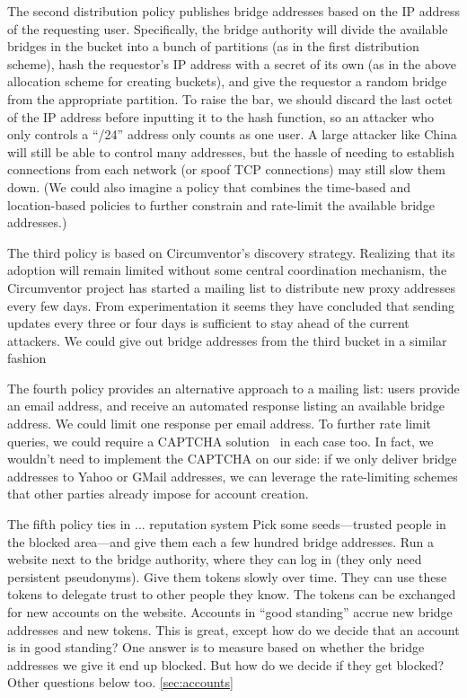 \documentclass{llncs}
\begin{document}
The second distribution policy publishes bridge addresses based on the IP
address of the requesting user. Specifically, the bridge authority will
divide the available bridges in the bucket into a bunch of partitions
(as in the first distribution scheme), hash the requestor's IP address
with a secret of its own (as in the above allocation scheme for creating
buckets), and give the requestor a random bridge from the appropriate
partition. To raise the bar, we should discard the last octet of the
IP address before inputting it to the hash function, so an attacker
who only controls a ``/24'' address only counts as one user. A large
attacker like China will still be able to control many addresses, but
the hassle of needing to establish connections from each network (or
spoof TCP connections) may still slow them down. (We could also imagine
a policy that combines the time-based and location-based policies to
further constrain and rate-limit the available bridge addresses.)

The third policy is based on Circumventor's discovery strategy. Realizing
that its adoption will remain limited without some central coordination
mechanism, the Circumventor project has started a mailing list to
distribute new proxy addresses every few days. From experimentation it
seems they have concluded that sending updates every three or four days
is sufficient to stay ahead of the current attackers. We could give out
bridge addresses from the third bucket in a similar fashion

The fourth policy provides an alternative approach to a mailing list:
users provide an email address, and receive an automated response
listing an available bridge address. We could limit one response per
email address. To further rate limit queries, we could require a CAPTCHA
solution~\cite{captcha} in each case too. In fact, we wouldn't need to
implement the CAPTCHA on our side: if we only deliver bridge addresses
to Yahoo or GMail addresses, we can leverage the rate-limiting schemes
that other parties already impose for account creation.

The fifth policy ties in
...
reputation system
Pick some seeds---trusted people in the blocked area---and give
them each a few hundred bridge addresses. Run a website next to the
bridge authority, where they can log in (they only need persistent
pseudonyms). Give them tokens slowly over time. They can use these
tokens to delegate trust to other people they know. The tokens can
be exchanged for new accounts on the website.
Accounts in ``good standing'' accrue new bridge addresses and new
tokens.
This is great, except how do we decide that an account is in good
standing? One answer is to measure based on whether the bridge addresses
we give it end up blocked. But how do we decide if they get blocked?
Other questions below too.
\ref{sec:accounts}
\end{document}

